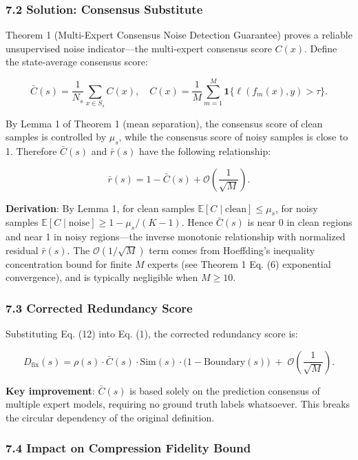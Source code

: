 \documentclass[
  12pt,
]{article}
\begin{document}
\subsubsection{7.2 Solution: Consensus Substitute}\label{solution-consensus-substitute}

Theorem 1 (Multi-Expert Consensus Noise Detection Guarantee) proves a reliable unsupervised noise indicator---the multi-expert consensus score
\(C(x)\). Define the state-average consensus score:

\[
\bar{C}(s) = \frac{1}{N_s} \sum_{x \in S_s} C(x), \quad C(x) = \frac{1}{M} \sum_{m=1}^M \mathbf{1}\{\ell(f_m(x), y) > \tau\}.
\]

By Lemma 1 of Theorem 1 (mean separation), the consensus score of clean samples is controlled by \(\mu_s\), while the consensus score of noisy samples is close to 1. Therefore \(\bar{C}(s)\) and \(\bar{r}(s)\) have the following relationship:

\[
\bar{r}(s) = 1 - \bar{C}(s) + \mathcal{O}\!\left(\frac{1}{\sqrt{M}}\right).
\tag{12}
\]

\textbf{Derivation}: By Lemma 1, for clean samples \(\mathbb{E}[C \mid \text{clean}] \leq \mu_s\), for noisy samples \(\mathbb{E}[C \mid \text{noise}] \geq 1 - \mu_s/(K-1)\). Hence \(\bar{C}(s)\) is near 0 in clean regions and near 1 in noisy regions---the inverse monotonic relationship with normalized residual \(\bar{r}(s)\). The \(\mathcal{O}(1/\sqrt{M})\) term comes from Hoeffding's inequality concentration bound for finite \(M\) experts (see Theorem 1 Eq. (6) exponential convergence), and is typically negligible when \(M \geq 10\).

\subsubsection{7.3 Corrected Redundancy Score}\label{corrected-redundancy-score}

Substituting Eq. (12) into Eq. (1), the corrected redundancy score is:

\[
D_{\text{fix}}(s) = \rho(s) \cdot \bar{C}(s) \cdot \text{Sim}(s) \cdot \bigl(1 - \text{Boundary}(s)\bigr) \;+\; \mathcal{O}\!\left(\frac{1}{\sqrt{M}}\right).
\tag{13}
\]

\textbf{Key improvement}: \(\bar{C}(s)\) is based solely on the prediction consensus of multiple expert models, requiring no ground truth labels whatsoever. This breaks the circular dependency of the original definition.

\subsubsection{7.4 Impact on Compression Fidelity Bound}\label{impact-fidelity-bound}
\end{document}
